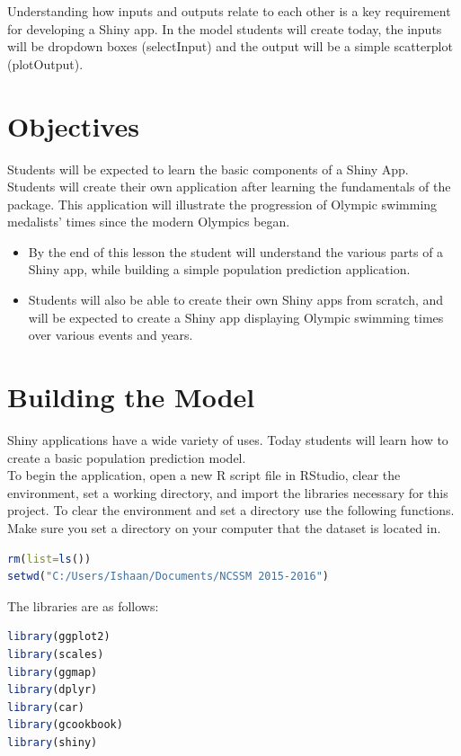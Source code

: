 Understanding how inputs and outputs relate to each other is a key requirement for developing a Shiny app. In the model students will create today, the inputs will be dropdown boxes (selectInput) and the output will be a simple scatterplot (plotOutput). 

\section{Objectives}
Students will be expected to learn the basic components of a Shiny App.
Students will create their own application after learning the fundamentals of the package.
This application will illustrate the progression of Olympic swimming medalists' times since the modern Olympics began. 
\begin{itemize}
\item By the end of this lesson the student will understand the various parts of a Shiny app, while building a simple population prediction application.
\item Students will also be able to create their own Shiny apps from scratch, and will be expected to create a Shiny app displaying Olympic swimming times over various events and years.
\end{itemize}
\section{Building the Model}

Shiny applications have a wide variety of uses. Today students will learn how to create a basic population prediction model. \\

\noindent To begin the application, open a new R script file in RStudio, clear the environment, set a working directory, and import the libraries necessary for this project. To clear the environment and set a directory use the following functions. Make sure you set a directory on your computer that the dataset is located in. 

\begin{lstlisting}[language = R]
rm(list=ls())
setwd("C:/Users/Ishaan/Documents/NCSSM 2015-2016")
\end{lstlisting}

\noindent The libraries are as follows:

\begin{lstlisting}[language = R]
library(ggplot2)
library(scales)
library(ggmap)
library(dplyr)
library(car)
library(gcookbook)
library(shiny)
\end{lstlisting}


